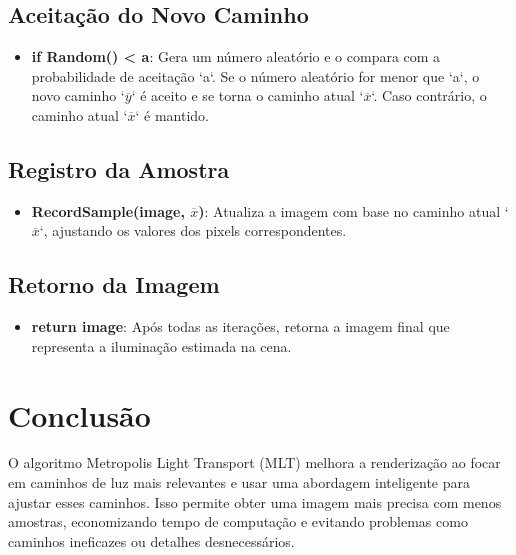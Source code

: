 \documentclass{article}
\begin{document}
\subsection{Aceitação do Novo Caminho}
\begin{itemize}
    \item \textbf{if Random() < a}: Gera um número aleatório e o compara com a probabilidade de aceitação `a`. Se o número aleatório for menor que `a`, o novo caminho `\(\overline{y}\)` é aceito e se torna o caminho atual `\(\overline{x}\)`. Caso contrário, o caminho atual `\(\overline{x}\)` é mantido.
\end{itemize}

\subsection{Registro da Amostra}
\begin{itemize}
    \item \textbf{RecordSample(image, \(\overline{x}\))}: Atualiza a imagem com base no caminho atual `\(\overline{x}\)`, ajustando os valores dos pixels correspondentes.
\end{itemize}

\subsection{Retorno da Imagem}
\begin{itemize}
    \item \textbf{return image}: Após todas as iterações, retorna a imagem final que representa a iluminação estimada na cena.
\end{itemize}

\section{Conclusão}
O algoritmo Metropolis Light Transport (MLT) melhora a renderização ao focar em caminhos de luz mais relevantes e usar uma abordagem inteligente para ajustar esses caminhos. Isso permite obter uma imagem mais precisa com menos amostras, economizando tempo de computação e evitando problemas como caminhos ineficazes ou detalhes desnecessários.
\end{document}
